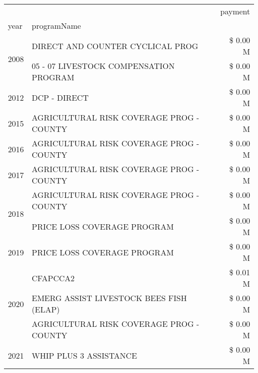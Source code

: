 \begin{tabular}{llr}
\toprule
 &  & payment \\
year & programName &  \\
\midrule
\multirow[t]{2}{*}{2008} & DIRECT AND COUNTER CYCLICAL PROG & \$ 0.00 M \\
 & 05 - 07 LIVESTOCK COMPENSATION PROGRAM & \$ 0.00 M \\
\cline{1-3}
2012 & DCP - DIRECT & \$ 0.00 M \\
\cline{1-3}
2015 & AGRICULTURAL RISK COVERAGE PROG - COUNTY & \$ 0.00 M \\
\cline{1-3}
2016 & AGRICULTURAL RISK COVERAGE PROG - COUNTY & \$ 0.00 M \\
\cline{1-3}
2017 & AGRICULTURAL RISK COVERAGE PROG - COUNTY & \$ 0.00 M \\
\cline{1-3}
\multirow[t]{2}{*}{2018} & AGRICULTURAL RISK COVERAGE PROG - COUNTY & \$ 0.00 M \\
 & PRICE LOSS COVERAGE PROGRAM & \$ 0.00 M \\
\cline{1-3}
2019 & PRICE LOSS COVERAGE PROGRAM & \$ 0.00 M \\
\cline{1-3}
\multirow[t]{3}{*}{2020} & CFAPCCA2 & \$ 0.01 M \\
 & EMERG ASSIST LIVESTOCK BEES FISH (ELAP) & \$ 0.00 M \\
 & AGRICULTURAL RISK COVERAGE PROG - COUNTY & \$ 0.00 M \\
\cline{1-3}
2021 & WHIP PLUS 3 ASSISTANCE & \$ 0.00 M \\
\cline{1-3}
\bottomrule
\end{tabular}
